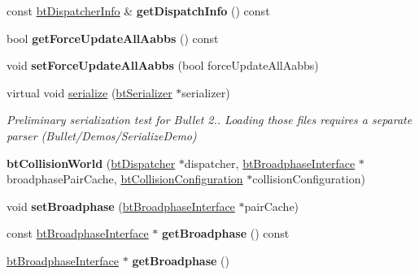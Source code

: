\begin{DoxyCompactItemize}
const \hyperlink{structbtDispatcherInfo}{bt\+Dispatcher\+Info} \& {\bfseries get\+Dispatch\+Info} () const
\item 
\mbox{\label{classbtCollisionWorld_ab41ca6cd3134844d52a431a27e2edb6d}} 
bool {\bfseries get\+Force\+Update\+All\+Aabbs} () const
\item 
\mbox{\label{classbtCollisionWorld_a482d6276966521c8bf89513830e377a9}} 
void {\bfseries set\+Force\+Update\+All\+Aabbs} (bool force\+Update\+All\+Aabbs)
\item 
\mbox{\label{classbtCollisionWorld_a152b79ca83fdb13ed7f1cc86ac214f66}} 
virtual void \hyperlink{classbtCollisionWorld_a152b79ca83fdb13ed7f1cc86ac214f66}{serialize} (\hyperlink{classbtSerializer}{bt\+Serializer} $\ast$serializer)
\begin{DoxyCompactList}\small\item\em Preliminary serialization test for Bullet 2.. Loading those files requires a separate parser (Bullet/\+Demos/\+Serialize\+Demo) \end{DoxyCompactList}\item 
\mbox{\label{classbtCollisionWorld_a6d2c3ec40c17296308c2b229ae3962ea}} 
{\bfseries bt\+Collision\+World} (\hyperlink{classbtDispatcher}{bt\+Dispatcher} $\ast$dispatcher, \hyperlink{classbtBroadphaseInterface}{bt\+Broadphase\+Interface} $\ast$broadphase\+Pair\+Cache, \hyperlink{classbtCollisionConfiguration}{bt\+Collision\+Configuration} $\ast$collision\+Configuration)
\item 
\mbox{\label{classbtCollisionWorld_ad55a4c7bd8fb64e4caf6c58e62795bfb}} 
void {\bfseries set\+Broadphase} (\hyperlink{classbtBroadphaseInterface}{bt\+Broadphase\+Interface} $\ast$pair\+Cache)
\item 
\mbox{\label{classbtCollisionWorld_a214257b6cf2ab762454254ab4c79e1d9}} 
const \hyperlink{classbtBroadphaseInterface}{bt\+Broadphase\+Interface} $\ast$ {\bfseries get\+Broadphase} () const
\item 
\mbox{\label{classbtCollisionWorld_a6138b6b1a4496a6857f1dfa71f6841e5}} 
\hyperlink{classbtBroadphaseInterface}{bt\+Broadphase\+Interface} $\ast$ {\bfseries get\+Broadphase} ()

\end{DoxyCompactItemize}
